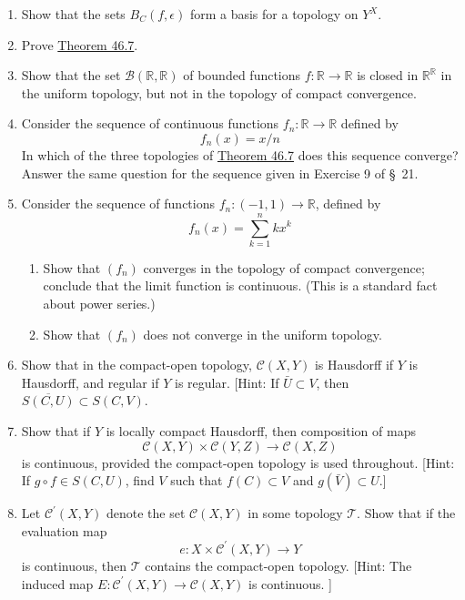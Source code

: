 \begin{enumerate}[itemsep=0.4em, parsep=0pt, topsep=0pt, partopsep=0pt, leftmargin=*, label=\arabic*., ref=\arabic*]
\item Show that the sets \(B_{C}({f,\epsilon })\) form a basis for a topology on \(Y^{X}\).
\item Prove \hyperref[thm:46.7]{Theorem 46.7}.
\item Show that the set \(\mathcal{B}({\mathbb{R},\mathbb{R}})\) of bounded functions \(f : \mathbb{R} \rightarrow \mathbb{R}\) is closed in \(\mathbb{R}^{\mathbb{R}}\) in the uniform topology, but not in the topology of compact convergence.
\item Consider the sequence of continuous functions \(f_{n} : \mathbb{R} \rightarrow \mathbb{R}\) defined by \[ f_{n}(x) = x/n \] In which of the three topologies of \hyperref[thm:46.7]{Theorem 46.7} does this sequence converge? Answer the same question for the sequence given in Exercise 9 of \S\ 21.
\item Consider the sequence of functions \(f_{n} : ({-1,1}) \rightarrow \mathbb{R}\), defined by \[ f_{n}(x) = \mathop{\sum }\limits_{{k = 1}}^{n}kx^{k} \]
 \begin{enumerate}[itemsep=0.2em, parsep=0pt, topsep=0pt, partopsep=0pt, leftmargin=*, label=(\alph*), align=left]
 \item Show that \((f_{n})\) converges in the topology of compact convergence; conclude that the limit function is continuous. (This is a standard fact about power series.)
 \item Show that \((f_{n})\) does not converge in the uniform topology.
 \end{enumerate}
\item Show that in the compact-open topology, \(\mathcal{C}({X,Y})\) is Hausdorff if \(Y\) is Hausdorff, and regular if \(Y\) is regular. [Hint: If \(\bar{U} \subset V\), then \(\overline{S({C,U}) } \subset S({C,V})\).
\item Show that if \(Y\) is locally compact Hausdorff, then composition of maps \[ \mathcal{C}({X,Y}) \times \mathcal{C}({Y,Z}) \rightarrow \mathcal{C}({X,Z}) \] is continuous, provided the compact-open topology is used throughout. [Hint: If \(g \circ f \in S({C,U})\), find \(V\) such that \(f( C) \subset V\) and \(g( \bar{V}) \subset U\).]
\item Let \(\mathcal{C}^{\prime }({X,Y})\) denote the set \(\mathcal{C}({X,Y})\) in some topology \(\mathcal{T}\). Show that if the evaluation map \[ e : X \times {\mathcal{C}}^{\prime }({X,Y}) \rightarrow Y \] is continuous, then \(\mathcal{T}\) contains the compact-open topology. [Hint: The induced map \(E : \mathcal{C}^{\prime }({X,Y}) \rightarrow \mathcal{C}({X,Y})\) is continuous. ]

\end{enumerate}
